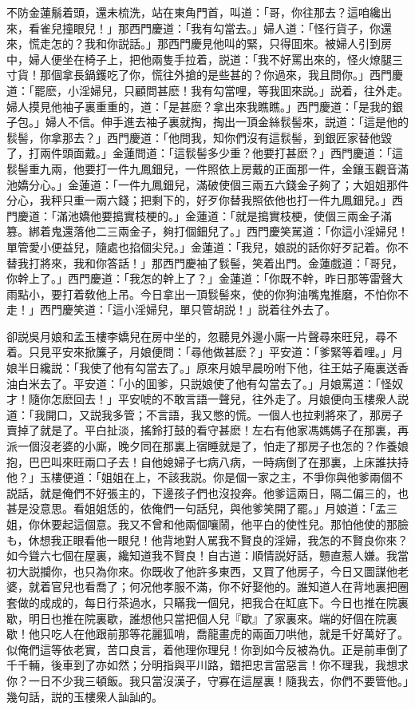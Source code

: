 不防金蓮鬅着頭，還未梳洗，站在東角門首，叫道：「哥，你往那去？這咱纔出來，看雀兒撞眼兒！」那西門慶道：「我有勾當去。」婦人道：「怪行貨子，你還來，慌走怎的？我和你説話。」那西門慶見他叫的緊，只得囬來。被婦人引到房中，婦人便坐在椅子上，把他兩隻手拉着，説道：「我不好罵出來的，怪火燎腿三寸貨！那個拿長鍋鑊吃了你，慌往外搶的是些甚的？你過來，我且問你。」西門慶道：「罷麽，小淫婦兒，只顧問甚麽！我有勾當哩，等我囬來説。」説着，往外走。婦人摸見他袖子裏重重的，道：「是甚麽？拿出來我瞧瞧。」西門慶道：「是我的銀子包。」婦人不信。伸手進去袖子裏就掏，掏出一頂金絲䯼髻來，説道：「這是他的䯼髻，你拿那去？」西門慶道：「他問我，知你們沒有這䯼髻，到銀匠家替他毀了，打兩件頭面戴。」金蓮問道：「這䯼髻多少重？他要打甚麽？」西門慶道：「這䯼髻重九兩，他要打一件九鳳鈿兒，一件照依上房戴的正面那一件，金鑲玉觀音滿池嬌分心。」金蓮道：「一件九鳳鈿兒，滿破使個三兩五六錢金子夠了；大姐姐那件分心，我秤只重一兩六錢；把剩下的，好歹你替我照依他也打一件九鳳鈿兒。」西門慶道：「滿池嬌他要搗實枝梗的。」金蓮道：「就是搗實枝梗，使個三兩金子滿篡。綁着鬼還落他二三兩金子，夠打個鈿兒了。」西門慶笑駡道：「你這小淫婦兒！單管愛小便益兒，隨處也掐個尖兒。」金蓮道：「我兒，娘説的話你好歹記着。你不替我打將來，我和你答話！」那西門慶袖了䯼髻，笑着出門。金蓮戲道：「哥兒，你幹上了。」西門慶道：「我怎的幹上了？」金蓮道：「你既不幹，昨日那等雷聲大雨點小，要打着敎他上吊。今日拿出一頂䯼髻來，使的你狗油嘴鬼推磨，不怕你不走！」西門慶笑道：「這小淫婦兒，單只管胡説！」説着往外去了。

卻説吳月娘和孟玉樓李嬌兒在房中坐的，忽聽見外邊小廝一片聲尋來旺兒，尋不着。只見平安來掀簾子，月娘便問：「尋他做甚麽？」平安道：「爹緊等着哩。」月娘半日纔説：「我使了他有勾當去了。」原來月娘早晨吩咐下他，往王姑子庵裏送香油白米去了。平安道：「小的囬爹，只説娘使了他有勾當去了。」月娘罵道：「怪奴才！隨你怎麽回去！」平安唬的不敢言語一聲兒，往外走了。月娘便向玉樓衆人説道：「我開口，又説我多管；不言語，我又憋的慌。一個人也拉剌將來了，那房子賣掉了就是了。平白扯淡，搖鈴打鼓的看守甚麽！左右有他家馮媽媽子在那裏，再派一個沒老婆的小廝，晚夕同在那裏上宿睡就是了，怕走了那房子也怎的？作養娘抱，巴巴叫來旺兩口子去！自他媳婦子七病八病，一時病倒了在那裏，上床誰扶持他？」玉樓便道：「姐姐在上，不該我説。你是個一家之主，不爭你與他爹兩個不説話，就是俺們不好張主的，下邊孩子們也沒投奔。他爹這兩日，隔二偏三的，也甚是没意思。看姐姐恁的，依俺們一句話兒，與他爹笑開了罷。」月娘道：「孟三姐，你休要起這個意。我又不曾和他兩個嚷鬧，他平白的使性兒。那怕他使的那臉も，休想我正眼看他一眼兒！他背地對人駡我不賢良的淫婦，我怎的不賢良你來？如今聳六七個在屋裏，纔知道我不賢良！自古道：順情説好話，戅直惹人嫌。我當初大説攔你，也只為你來。你既收了他許多東西，又買了他房子，今日又圖謀他老婆，就着官兒也看喬了；何况他孝服不滿，你不好娶他的。誰知道人在背地裏把圈套做的成成的，每日行茶過水，只瞞我一個兒，把我合在缸底下。今日也推在院裏歇，明日也推在院裏歇，誰想他只當把個人兒『歇』了家裏來。端的好個在院裏歇！他只吃人在他跟前那等花麗狐哨，喬龍畫虎的兩面刀哄他，就是千好萬好了。似俺們這等依老實，苦口良言，着他理你理兒！你到如今反被為仇。正是前車倒了千千輛，後車到了亦如然；分明指與平川路，錯把忠言當惡言！你不理我，我想求你？一日不少我三頓飯。我只當沒漢子，守寡在這屋裏！隨我去，你們不要管他。」幾句話，説的玉樓衆人訕訕的。

